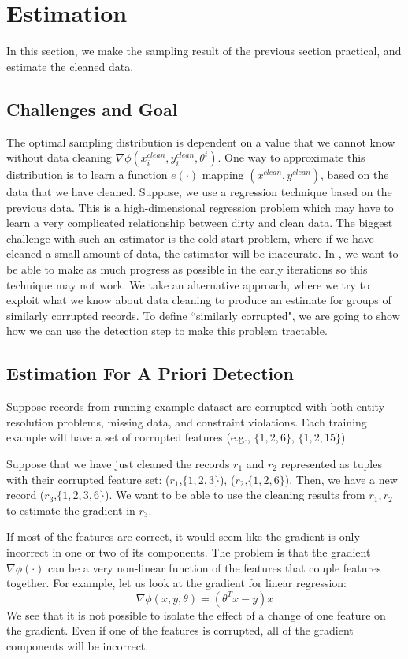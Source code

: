 \section{Estimation}\label{sampling}
In this section, we make the sampling result of the previous section practical,
and estimate the cleaned data.

\subsection{Challenges and Goal}
The optimal sampling distribution is dependent on a value that we cannot know without data cleaning $\nabla\phi(x^{clean}_i,y^{clean}_i,\theta^t)$.
One way to approximate this distribution is to learn a function $e(\cdot)$ mapping $(x^{clean}, y^{clean})$, based on the data that we have cleaned.
Suppose, we use a regression technique based on the previous data.
This is a high-dimensional regression problem which may have to learn a very complicated relationship between dirty and clean data.
The biggest challenge with such an estimator is the cold start problem, where if we have cleaned a small amount of data, the estimator will be inaccurate.
In \sys, we want to be able to make as much progress as possible in the early iterations so this technique may not work.
We take an alternative approach, where we try to exploit what we know about data cleaning to produce an estimate for groups of similarly corrupted records.
To define ``similarly corrupted", we are going to show how we can use the detection step to make this problem tractable.

\subsection{Estimation For A Priori Detection}
\begin{example}
Suppose records from running example dataset are corrupted with both entity resolution problems, missing data, and constraint violations. 
Each training example will have a set of corrupted features (e.g., $\{1,2,6\}$, $\{1,2,15\}$).

Suppose that we have just cleaned the records $r_1$ and $r_2$ represented as tuples with their corrupted feature set: ($r_1$,$\{1,2,3\}$), ($r_2$,$\{1,2,6\}$).
Then, we have a new record ($r_3$,$\{1,2,3,6\}$). 
We want to be able to use the cleaning results from $r_1,r_2$ to estimate the gradient in $r_3$.
\end{example}

If most of the features are correct, it would seem like the gradient is only
incorrect in one or two of its components.
The problem is that the gradient $\nabla\phi(\cdot)$ can be a very non-linear function of the features that couple features together.
For example, let us look at the gradient for linear regression:
\[
\nabla\phi(x,y,\theta) = (\theta^Tx - y)x
\]
We see that it is not possible to isolate the effect of a change of one feature on the gradient.
Even if one of the features is corrupted, all of the gradient components will be incorrect.

